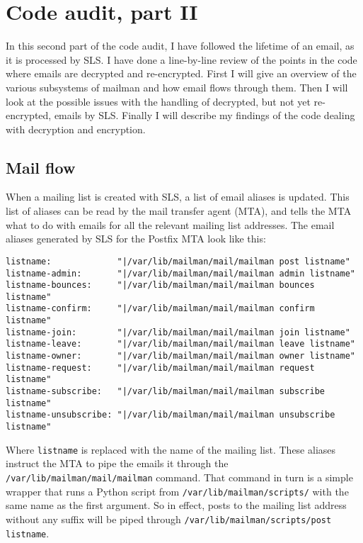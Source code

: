 \documentclass[a4]{article}
\newcommand{\file}[1]{\texttt{#1}}
\newcommand{\cmd}[1]{\texttt{#1}}
\begin{document}
\section{Code audit, part II}\label{sec:audit}

In this second part of the code audit, I have followed
the lifetime of an email, as it is processed by SLS.
I have done a line-by-line review of the points in the code where emails are decrypted and re-encrypted.
First I will give an overview of the various subsystems of mailman and how email flows through them.
Then I will look at the possible issues with the handling of decrypted, but not yet re-encrypted, emails by SLS.
Finally I will describe my findings of the code dealing with decryption and encryption.

\subsection{Mail flow}\label{sec:mailflow}

When a mailing list is created with SLS,
a list of email aliases is updated.
This list of aliases can be read by the mail transfer agent (MTA),
and tells the MTA what to do with emails for all the relevant mailing list addresses.
The email aliases generated by SLS for the Postfix MTA look like this:

\begin{verbatim}
listname:             "|/var/lib/mailman/mail/mailman post listname"
listname-admin:       "|/var/lib/mailman/mail/mailman admin listname"
listname-bounces:     "|/var/lib/mailman/mail/mailman bounces listname"
listname-confirm:     "|/var/lib/mailman/mail/mailman confirm listname"
listname-join:        "|/var/lib/mailman/mail/mailman join listname"
listname-leave:       "|/var/lib/mailman/mail/mailman leave listname"
listname-owner:       "|/var/lib/mailman/mail/mailman owner listname"
listname-request:     "|/var/lib/mailman/mail/mailman request listname"
listname-subscribe:   "|/var/lib/mailman/mail/mailman subscribe listname"
listname-unsubscribe: "|/var/lib/mailman/mail/mailman unsubscribe listname"
\end{verbatim}

Where \verb|listname| is replaced with the name of the mailing list.
These aliases instruct the MTA to pipe the emails it through the \file{/var/lib/mailman/mail/mailman} command.
That command in turn is a simple wrapper that runs a Python script from \file{/var/lib/mailman/scripts/} with the same name as the first argument.
So in effect, posts to the mailing list address without any suffix will be piped through \cmd{/var/lib/mailman/scripts/post listname}.
\end{document}
